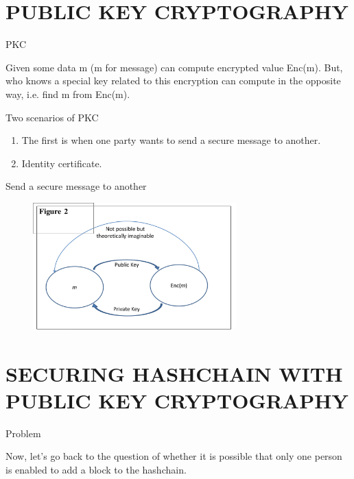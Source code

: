 \documentclass[serif]{beamer}
\begin{document}
\section{PUBLIC KEY CRYPTOGRAPHY}

\begin{frame}{PKC}
	\begin{definition}
			Given some data m (m for message) {\color{red}{anyone}}
			can compute encrypted value Enc(m). But, {\color{red}{only the one}} who
			knows a special key related to this encryption can compute in
			the opposite way, i.e. find m from Enc(m).
	\end{definition}
\end{frame}

\begin{frame}{Two scenarios of PKC}
	\begin{enumerate}[<+->]
		\item The first is when one party wants to send a secure message to another.
		\item Identity certificate.
	\end{enumerate}
\end{frame}

\begin{frame}{Send a secure message to another}
	\begin{figure}
		\includegraphics[width=0.7\textwidth]{pkc}
		\label{fig:pkc}
	\end{figure}	
\end{frame}




\section{SECURING HASHCHAIN WITH PUBLIC KEY CRYPTOGRAPHY}

\begin{frame}{Problem}
	\begin{problem}
		Now, let’s go back to the question of whether it is possible
		that only one person is enabled to add a block to the hashchain.
	\end{problem}
\end{frame}
\end{document}
